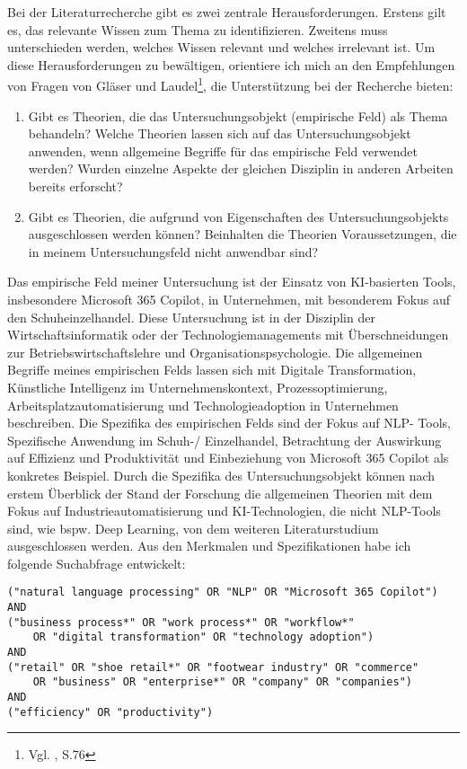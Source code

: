 Bei der Literaturrecherche gibt es zwei zentrale Herausforderungen. Erstens gilt es, das relevante Wissen zum Thema zu identifizieren. Zweitens muss unterschieden werden, welches Wissen relevant und welches irrelevant ist. Um diese Herausforderungen zu bewältigen, orientiere ich mich an den Empfehlungen von Fragen von Gläser und Laudel\footnote{Vgl. \cite{Glaeser2010}, S.76}, die Unterstützung bei der Recherche bieten:

\begin{enumerate}
    \item Gibt es Theorien, die das Untersuchungsobjekt (empirische Feld) als Thema behandeln? Welche Theorien lassen sich auf das Untersuchungsobjekt anwenden, wenn allgemeine Begriffe für das empirische Feld verwendet werden? Wurden einzelne Aspekte der gleichen Disziplin in anderen Arbeiten bereits erforscht?
    \item Gibt es Theorien, die aufgrund von Eigenschaften des Untersuchungsobjekts ausgeschlossen werden können? Beinhalten die Theorien Voraussetzungen, die in meinem Untersuchungsfeld nicht anwendbar sind?
\end{enumerate}

Das empirische Feld meiner Untersuchung ist der Einsatz von KI-basierten Tools, insbesondere Microsoft 365 Copilot, in Unternehmen, mit besonderem Fokus auf den Schuheinzelhandel. Diese Untersuchung ist in der Disziplin der Wirtschaftsinformatik oder der Technologiemanagements mit Überschneidungen zur Betriebswirtschaftslehre und Organisationspsychologie. Die allgemeinen Begriffe meines empirischen Felds lassen sich mit Digitale Transformation, Künstliche Intelligenz im Unternehmenskontext, Prozessoptimierung, Arbeitsplatzautomatisierung und Technologieadoption in Unternehmen beschreiben. Die Spezifika des empirischen Felds sind der Fokus auf NLP- Tools, Spezifische Anwendung im Schuh-/ Einzelhandel, Betrachtung der Auswirkung auf Effizienz und Produktivität und Einbeziehung von Microsoft 365 Copilot als konkretes Beispiel. Durch die Spezifika des Untersuchungsobjekt können nach erstem Überblick der Stand der Forschung die allgemeinen Theorien mit dem Fokus auf Industrieautomatisierung und KI-Technologien, die nicht NLP-Tools sind, wie bspw. Deep Learning, von dem weiteren Literaturstudium ausgeschlossen werden. 
Aus den Merkmalen und Spezifikationen habe ich folgende Suchabfrage entwickelt:
\begin{verbatim}
("natural language processing" OR "NLP" OR "Microsoft 365 Copilot") 
AND 
("business process*" OR "work process*" OR "workflow*" 
    OR "digital transformation" OR "technology adoption") 
AND 
("retail" OR "shoe retail*" OR "footwear industry" OR "commerce" 
    OR "business" OR "enterprise*" OR "company" OR "companies") 
AND 
("efficiency" OR "productivity") 
\end{verbatim}

